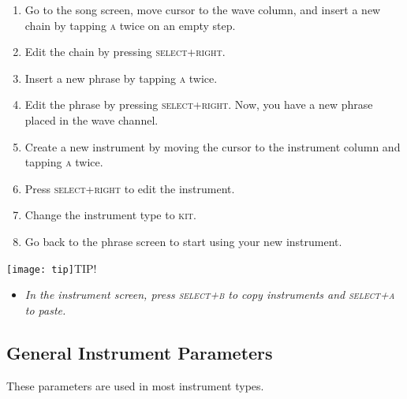 \begin{enumerate}
\item Go to the song screen, move cursor to the wave column, and insert a new chain by tapping \textsc{a} twice on an empty step.
\item	Edit the chain by pressing \textsc{select+right}.
\item	Insert a new phrase by tapping \textsc{a} twice.
\item	Edit the phrase by pressing \textsc{select+right}. Now, you have a new phrase placed in the wave channel.
\item	Create a new instrument by moving the cursor to the instrument column and tapping \textsc{a} twice.
\item	Press \textsc{select+right} to edit the instrument.
\item	Change the instrument type to \textsc{kit}.
\item	Go back to the phrase screen to start using your new instrument.
\end{enumerate}

\texttt{[image: tip]}TIP!
\begin{itemize}
	\item \textit{In the instrument screen, press \textsc{select+b} to copy instruments and \textsc{select+a} to paste.}
\end{itemize}

\subsection{General Instrument Parameters}
\label{general-instrument-parameters}

These parameters are used in most instrument types.

